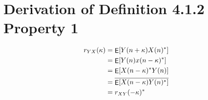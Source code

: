 \documentclass[nochapterpage,bigchapter,linedtoc,longdoc,colorback,accentcolor=tud2c]{tudreport}
\DeclareMathOperator{\expectation}{\mathsf{E}}
\DeclarePairedDelimiter\eckigeklammer{[}{]}
\newcommand{\expect}[1]{\expectation \eckigeklammer*{#1}}
\begin{document}
\section{Derivation of Definition 4.1.2 Property 1}
\begin{equation*}
 \begin{aligned}
	r_{YX}(\kappa) &= \expect{Y(n+ \kappa) X(n)^*} \\
	&= \expect{Y(n) x(n-\kappa )^*} \\
	&= \expect{X(n-\kappa)^* Y(n)} \\
	&= \overline{\expect{X(n-\kappa)Y(n)^*}} \\
	&= r_{XY}(-\kappa)^*\\
 \end{aligned}
\end{equation*}
\end{document}
